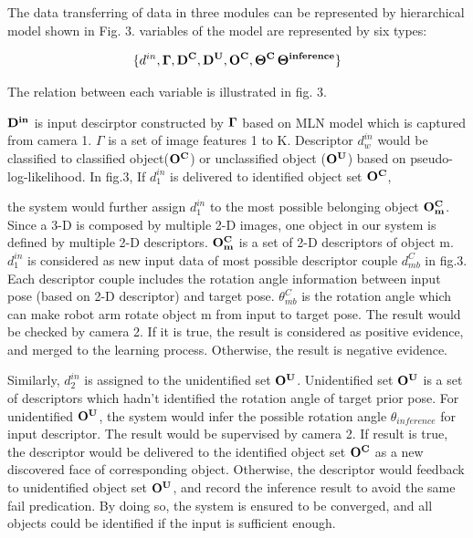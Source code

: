 \documentclass[journal]{IEEEtran}
\begin{document}
The data transferring of data in three modules can be represented by hierarchical model shown in Fig. 3. variables of the model are represented by six types:

\begin{displaymath}
\{d^{in},\bf{\Gamma},\bf{D^{{C}}},\bf{D^{{U}}},\bf{O^{C}},\bf{\Theta^{C}}\,\bf{\Theta^{inference}}\}
\end{displaymath}

The relation between each variable is illustrated in fig. 3. 


 $\bf{D^{in}}$ is input descirptor constructed by $\bf{\Gamma}$ based on MLN model which is captured from camera 1. $\Gamma$ is a set of image features 1 to K. Descriptor $d^{in}_w$ would be classified to classified object($\bf{O^C}$) or unclassified object ($\bf{O^U}$) based on pseudo-log-likelihood. In fig.3, If $d^{in}_1$ is delivered to identified object set $\bf{O^C}$, 
 
 
  the system would further assign $d^{in}_1$ to the most possible belonging object $\bf{O^C_m}$. Since a 3-D is composed by multiple 2-D images, one object in our system is defined by multiple 2-D descriptors. $\bf{O^C_m}$ is a set of 2-D descriptors of object m. $d^{in}_1$ is considered as new input data of most possible descriptor couple $d^C_{mb}$ in fig.3. Each descriptor couple includes the rotation angle information between input pose (based on 2-D descriptor) and target pose. $\theta^C_{mb}$ is the rotation angle which can make robot arm rotate object m from input to target pose. The result would be checked by camera 2. If it is true, the result is considered as positive evidence, and merged to the learning process. Otherwise, the result is negative evidence.  

Similarly, $d^{in}_2$ is assigned to the unidentified set $\bf{O^U}$. Unidentified set $\bf{O^U}$ is a set of descriptors which hadn't identified the rotation angle of target prior pose. For unidentified $\bf{O^U}$, the system would infer the possible rotation angle $\theta_{inference}$ for input descriptor. The result would be supervised by camera 2. If result is true, the descriptor would be delivered to the identified object set $\bf{O^C}$ as a new discovered face of corresponding object. Otherwise, the descriptor would feedback to unidentified object set $\bf{O^U}$, and record the inference result to avoid the same fail predication. By doing so, the system is ensured to be converged, and all objects could be identified if the input is sufficient enough.
\end{document}
